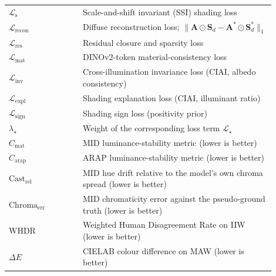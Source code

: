 \begin{longtable}{p{0.25\linewidth} p{0.65\linewidth}}
$\mathcal{L}_{\text{s}}$
  & Scale-and-shift invariant (SSI) shading loss \\

$\mathcal{L}_{\text{recon}}$
  & Diffuse reconstruction loss; $\|\mathbf{A} \odot \mathbf{S}_d - \mathbf{A}^* \odot \mathbf{S}^*_d\|_1$ \\

$\mathcal{L}_{\text{res}}$
  & Residual closure and sparsity loss \\

$\mathcal{L}_{\text{mat}}$
  & DINOv2-token material-consistency loss \\

$\mathcal{L}_{\text{inv}}$
  & Cross-illumination invariance loss (CIAI, albedo consistency) \\

$\mathcal{L}_{\text{expl}}$
  & Shading explanation loss (CIAI, illuminant ratio) \\

$\mathcal{L}_{\text{sign}}$
  & Shading sign loss (positivity prior) \\

$\lambda_{\star}$
  & Weight of the corresponding loss term $\mathcal{L}_{\star}$ \\

$C_{\text{mat}}$
  & MID luminance-stability metric (lower is better) \\

$C_{\text{arap}}$
  & ARAP luminance-stability metric (lower is better) \\

$\text{Cast}_{\text{rel}}$
  & MID hue drift relative to the model's own chroma spread (lower is better) \\

$\text{Chroma}_{\text{err}}$
  & MID chromaticity error against the pseudo-ground truth (lower is better) \\

$\text{WHDR}$
  & Weighted Human Disagreement Rate on IIW (lower is better) \\

$\Delta E$
  & CIELAB colour difference on MAW (lower is better) \\

\end{longtable}
